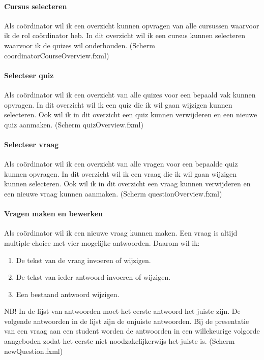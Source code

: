 \documentclass[11pt, a4paper]{article}
\begin{document}
\paragraph{Cursus selecteren}
Als co\"ordinator wil ik een overzicht kunnen opvragen van alle cursussen waarvoor ik de rol co\"ordinator heb.
In dit overzicht wil ik een cursus kunnen selecteren waarvoor ik de quizes wil onderhouden. (Scherm coordinatorCourseOverview.fxml)

\paragraph{Selecteer quiz}
Als co\"ordinator wil ik een overzicht van alle quizes voor een bepaald vak kunnen opvragen.
In dit overzicht wil ik een quiz die ik wil gaan wijzigen kunnen selecteren.
Ook wil ik in dit overzicht een quiz kunnen verwijderen en een nieuwe quiz aanmaken. (Scherm quizOverview.fxml)

\paragraph{Selecteer vraag}
Als co\"ordinator wil ik een overzicht van alle vragen voor een bepaalde quiz kunnen opvragen.
In dit overzicht wil ik een vraag die ik wil gaan wijzigen kunnen selecteren.
Ook wil ik in dit overzicht een vraag kunnen verwijderen en een nieuwe vraag kunnen aanmaken. (Scherm questionOverview.fxml)

\paragraph{Vragen maken en bewerken}
Als co\"ordinator wil ik een nieuwe vraag kunnen maken.
Een vraag is altijd multiple-choice met vier mogelijke antwoorden.
Daarom wil ik:
\begin{enumerate}
\item De tekst van de vraag invoeren of wijzigen.
\item De tekst van ieder antwoord invoeren of wijzigen.
\item Een bestaand antwoord wijzigen.
\end{enumerate}

NB! In de lijst van antwoorden moet het eerste antwoord het juiste zijn.
De volgende antwoorden in de lijst zijn de onjuiste antwoorden.
Bij de presentatie van een vraag aan een student worden de antwoorden in een willekeurige volgorde aangeboden zodat het eerste niet noodzakelijkerwijs het juiste is. (Scherm newQuestion.fxml)
\end{document}
